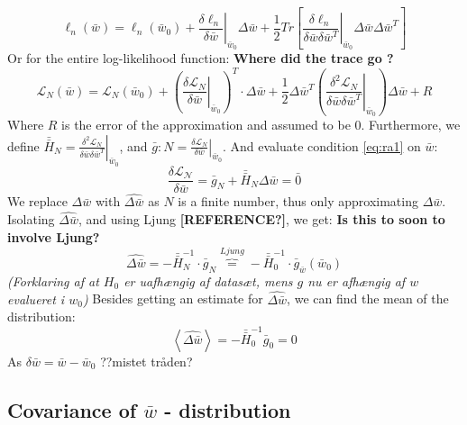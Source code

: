 \begin{equation}
\ell_n(\bar{w}) = 
\ell_n\left(\bar{w}_0 \right) + 
\left. \frac{\delta \ell_n}{\delta \bar{w}} \right|_{\bar{w}_0} \Delta \bar{w} + 
\frac{1}{2} Tr \left[ \left. \frac{\delta \ell_n}{\delta \bar{w} \delta \bar{w}^T} \right|_{\bar{w}_0} \Delta \bar{w} \Delta \bar{w}^T \right] \label{eq:loglihood-oneObs}
\end{equation}
Or for the entire log-likelihood function: \textbf{Where did the trace go ?}
\begin{equation}
\mathcal{L}_N(\bar{w}) = 
\mathcal{L}_N\left(\bar{w}_0\right) + 
\left(\left.\frac{\delta \mathcal{L}_N}{\delta \bar{w}}\right|_{\bar{w}_0} \right)^T \cdot \Delta \bar{w} +
\frac{1}{2} \Delta \bar{w}^T \left( \left. \frac{\delta^2 \mathcal{L}_N}{\delta \bar{w} \delta \bar{w}^T}\right|_{\bar{w}_0} \right) \Delta \bar{w} + R \label{eq:entireLogLike}
\end{equation}
Where $R$ is the error of the approximation and assumed to be 0. Furthermore, we define $\bar{\bar{H}}_N = \left. \frac{\delta^2 \mathcal{L}_N}{\delta \bar{w} \delta \bar{w}^T}\right|_{\bar{w}_0}$, and $\bar{g}:N = \left.\frac{\delta \mathcal{L}_N}{\delta \bar{w}}\right|_{\bar{w}_0}$. And evaluate condition \eqref{eq:ra1} on $\bar{w}$:
\begin{equation}
\frac{\delta \mathcal{L_N}}{\delta \bar{w}} = \bar{g}_N+\bar{\bar{H}}_N \Delta \bar{w} = \bar{0}
\end{equation}
We replace $\Delta \bar{w}$ with $\hat{\Delta \bar{w}}$  as $N$ is a finite number, thus only approximating $\Delta \bar{w}$. Isolating $\hat{\Delta \bar{w}}$, and using Ljung \textbf{[REFERENCE?]}, we get: \textbf{Is this to soon to involve Ljung?}
\begin{equation}
\hat{\Delta \bar{w}} = - \bar{\bar{H}}_N^{-1} \cdot \bar{g}_N \overbrace{=}^{Ljung} -\bar{\bar{H}}
_0^{-1} \cdot \bar{g}_{\bar{w}} \left( \bar{w}_0 \right)
\end{equation}
\emph{(Forklaring af at $H_0$ er uafhængig af datasæt, mens $g$ nu er afhængig af $w$ evalueret i $w_0$)}
Besides getting an estimate for $\hat{\Delta \bar{w}}$, we can find the mean of the distribution:
\[
\left\langle \hat{\Delta \bar{w}} \right\rangle = - \bar{\bar{H}}_0^{-1} \bar{g}_0 = 0
\]
As $\delta \bar{w} = \bar{w}-\bar{w}_0$ ??mistet tråden?

\subsection{Covariance of $\bar{w}$ - distribution}



